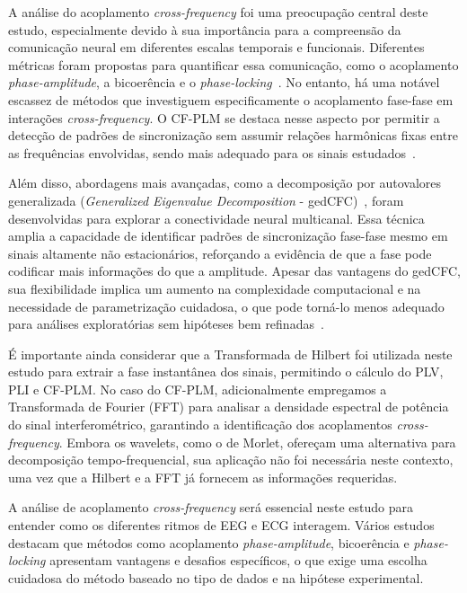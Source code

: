 A análise do acoplamento \textit{cross-frequency} foi uma preocupação central deste estudo, especialmente devido à sua importância para a compreensão da comunicação neural em diferentes escalas temporais e funcionais. Diferentes métricas foram propostas para quantificar essa comunicação, como o acoplamento \textit{phase-amplitude}, a bicoerência e o \textit{phase-locking}~\cite{hulsemann2019quantification}. No entanto, há uma notável escassez de métodos que investiguem especificamente o acoplamento fase-fase em interações \textit{cross-frequency}. O CF-PLM se destaca nesse aspecto por permitir a detecção de padrões de sincronização sem assumir relações harmônicas fixas entre as frequências envolvidas, sendo mais adequado para os sinais estudados~\cite{sorrentino2022detection, seraj2018cerebral, chen2023multiple}.

Além disso, abordagens mais avançadas, como a decomposição por autovalores generalizada (\textit{Generalized Eigenvalue Decomposition} - gedCFC)~\cite{cohen2017where}, foram desenvolvidas para explorar a conectividade neural multicanal. Essa técnica amplia a capacidade de identificar padrões de sincronização fase-fase mesmo em sinais altamente não estacionários, reforçando a evidência de que a fase pode codificar mais informações do que a amplitude. Apesar das vantagens do gedCFC, sua flexibilidade implica um aumento na complexidade computacional e na necessidade de parametrização cuidadosa, o que pode torná-lo menos adequado para análises exploratórias sem hipóteses bem refinadas~\cite{cohen2017multivariate}.

É importante ainda considerar que a Transformada de Hilbert foi utilizada neste estudo para extrair a fase instantânea dos sinais, permitindo o cálculo do PLV, PLI e CF-PLM. No caso do CF-PLM, adicionalmente empregamos a Transformada de Fourier (FFT) para analisar a densidade espectral de potência do sinal interferométrico, garantindo a identificação dos acoplamentos \textit{cross-frequency}. Embora os wavelets, como o de Morlet, ofereçam uma alternativa para decomposição tempo-frequencial, sua aplicação não foi necessária neste contexto, uma vez que a Hilbert e a FFT já fornecem as informações requeridas.

A análise de acoplamento \textit{cross-frequency} será essencial neste estudo para entender como os diferentes ritmos de EEG e ECG interagem. Vários estudos \cite{hulsemann2019quantification} destacam que métodos como acoplamento \textit{phase-amplitude}, bicoerência e \textit{phase-locking} apresentam vantagens e desafios específicos, o que exige uma escolha cuidadosa do método baseado no tipo de dados e na hipótese experimental.

